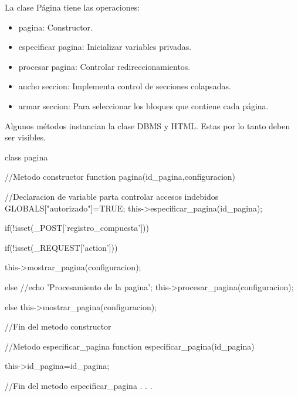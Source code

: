La clase Página tiene las operaciones:
\begin{itemize}
\item pagina: Constructor.
\item especificar pagina: Inicializar variables privadas.
\item procesar pagina: Controlar redireccionamientos.
\item ancho seccion: Implementa control de secciones colapsadas.
\item armar seccion: Para seleccionar los bloques que contiene cada página.
\end{itemize}

Algunos métodos instancian la clase DBMS y HTML. Estas por lo tanto deben ser visibles.
\begin{verbatim*}

class pagina
{

	//Metodo constructor
	function pagina(id_pagina,configuracion)
	{
		//Declaracion de variable parta controlar accesos indebidos
		GLOBALS["autorizado"]=TRUE;
		this->especificar_pagina(id_pagina);
		
		if(!isset(_POST['registro_compuesta']))
		{
			if(!isset(_REQUEST['action']))
			{
				
				this->mostrar_pagina(configuracion);
			}
			else
			{
				//echo 'Procesamiento de la pagina';
				this->procesar_pagina(configuracion);
			}
		}
		else
		{
			this->mostrar_pagina(configuracion);		
		}
	}
	//Fin del metodo constructor
	
	
	
	//Metodo especificar_pagina
	function especificar_pagina(id_pagina)
	{
	
		this->id_pagina=id_pagina;
	
	}
	//Fin del metodo especificar_pagina
.
.
.
} \end{verbatim*}